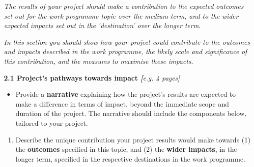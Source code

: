 \emph{The results of your project should make a contribution to the
expected outcomes set out for the work programme topic over the medium
term, and to the wider expected impacts set out in the `destination'
over the longer term. }

\emph{In this section you should show how your project could contribute
to the outcomes and impacts described in the work programme, the likely
scale and significance of this contribution, and the measures to
maximise these impacts.}\textbf{ }

\textbf{2.1 Project's pathways towards impact \emph{{[}}}\emph{e.g. 4
pages{]}}

\begin{itemize}
\item
  Provide a \textbf{narrative} explaining how the project's results are
  expected to make a difference in terms of impact, beyond the immediate
  scope and duration of the project. The narrative should include the
  components below, tailored to your project.
\end{itemize}

\begin{enumerate}
\def\labelenumi{\alph{enumi}.}
\item
  Describe the unique contribution your project results would make
  towards (1) the \textbf{outcomes} specified in this topic, and (2) the
  \textbf{wider impacts}, in the longer term, specified in the
  respective destinations in the work programme.
\end{enumerate}

